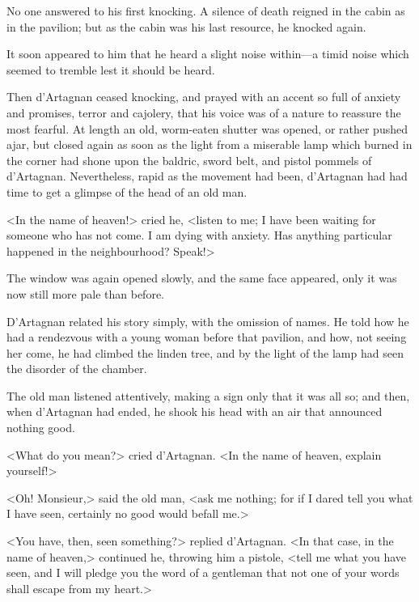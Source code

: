 No one answered to his first knocking. A silence of death reigned in the cabin as in the pavilion; but as the cabin was his last resource, he knocked again. 

It soon appeared to him that he heard a slight noise within---a timid noise which seemed to tremble lest it should be heard. 

Then d'Artagnan ceased knocking, and prayed with an accent so full of anxiety and promises, terror and cajolery, that his voice was of a nature to reassure the most fearful. At length an old, worm-eaten shutter was opened, or rather pushed ajar, but closed again as soon as the light from a miserable lamp which burned in the corner had shone upon the baldric, sword belt, and pistol pommels of d'Artagnan. Nevertheless, rapid as the movement had been, d'Artagnan had had time to get a glimpse of the head of an old man. 

<In the name of heaven!> cried he, <listen to me; I have been waiting for someone who has not come. I am dying with anxiety. Has anything particular happened in the neighbourhood? Speak!> 

The window was again opened slowly, and the same face appeared, only it was now still more pale than before. 

D'Artagnan related his story simply, with the omission of names. He told how he had a rendezvous with a young woman before that pavilion, and how, not seeing her come, he had climbed the linden tree, and by the light of the lamp had seen the disorder of the chamber. 

The old man listened attentively, making a sign only that it was all so; and then, when d'Artagnan had ended, he shook his head with an air that announced nothing good. 

<What do you mean?> cried d'Artagnan. <In the name of heaven, explain yourself!> 

<Oh! Monsieur,> said the old man, <ask me nothing; for if I dared tell you what I have seen, certainly no good would befall me.> 

<You have, then, seen something?> replied d'Artagnan. <In that case, in the name of heaven,> continued he, throwing him a pistole, <tell me what you have seen, and I will pledge you the word of a gentleman that not one of your words shall escape from my heart.> 

